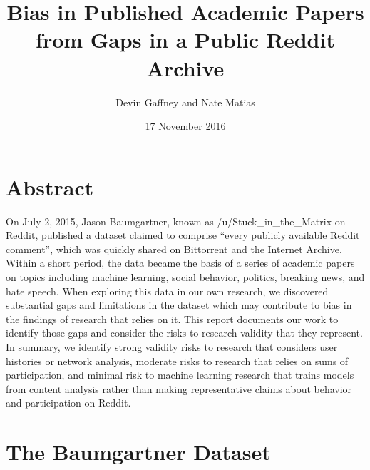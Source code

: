 \documentclass[letterpaper,12pt]{article}
\title{Bias in Published Academic Papers from Gaps in a Public Reddit Archive}
\date{17 November 2016}
\author{Devin Gaffney and Nate Matias}
\begin{document}
\maketitle
\doublespacing
\section{Abstract}
On July 2, 2015, Jason Baumgartner, known as /u/Stuck\_in\_the\_Matrix on Reddit, published a dataset claimed to comprise ``every publicly available Reddit comment'', which was quickly shared on Bittorrent and the Internet Archive. Within a short period, the data became the basis of a series of academic papers on topics including machine learning, social behavior, politics, breaking news, and hate speech. When exploring this data in our own research, we discovered substantial gaps and limitations in the dataset which may contribute to bias in the findings of research that relies on it. This report documents our work to identify those gaps and consider the risks to research validity that they represent. In summary, we identify strong validity risks to research that considers user histories or network analysis, moderate risks to research that relies on sums of participation, and minimal risk to machine learning research that trains models from content analysis rather than making representative claims about behavior and participation on Reddit.

\section{The Baumgartner Dataset}
\end{document}
